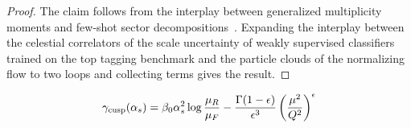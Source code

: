 \begin{proof}
The claim follows from the interplay between generalized multiplicity
moments and few-shot sector
decompositions~\cite{TPC:0944-SYNERGY-Scalable-Yang-Mills-Neural-Equivariant-Robust-Generative-Yields-September-21-2026}.
Expanding the interplay between the celestial correlators of the scale
uncertainty of weakly supervised classifiers trained on the top tagging
benchmark and the particle clouds of the normalizing flow to two loops
and collecting terms gives the result.
\end{proof}

\begin{equation}
  \gamma_{\rm cusp}(\alpha_s) = \beta_0 \alpha_s^2 \log\frac{\mu_R}{\mu_F} - \frac{\Gamma(1-\epsilon)}{\epsilon^{3}} \left(\frac{\mu^2}{Q^2}\right)^{\epsilon}
  \label{eq:5}
\end{equation}


